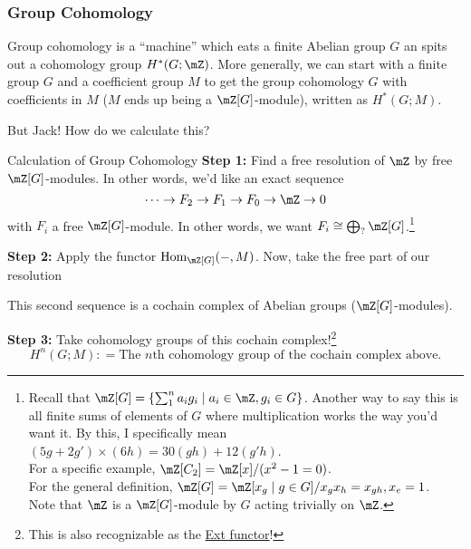 \newpage
\subsubsection{Group Cohomology}

Group cohomology is a ``machine'' which eats a finite Abelian group $G$ an spits out a cohomology group $H^\ast(G;\mZ)$. More generally, we can start with a finite group $G$ and a coefficient group $M$ to get the group cohomology $G$ with coefficients in $M$ ($M$ ends up being a $\mZ[G]$-module), written as $H^\ast(G;M)$. 

But Jack! How do we calculate this?

\begin{definition}{Calculation of Group Cohomology}{}
    \textbf{Step 1:} Find a free resolution of $\mZ$ by free $\mZ[G]$-modules. In other words, we'd like an exact sequence
    $$\cdots\to F_2\to F_1\to F_0\to \mZ\to 0$$
    with $F_i$ a free $\mZ[G]$-module. In other words, we want $F_i\cong \bigoplus_{?}\mZ[G]$.\footnote{Recall that $\mZ[G] = \sets{\sum_1^n a_i g_i\mid a_i\in \mZ, g_i\in G}$. Another way to say this is all finite sums of elements of $G$ where multiplication works the way you'd want it. By this, I specifically mean $(5g+2g')\times (6h) = 30(gh)+12(g'h)$. \\For a specific example, $\mZ[C_2] = \mZ[x]/(x^2-1 = 0)$. \\For the general definition, $\mZ[G] = \mZ[x_g\mid g\in G]/ x_gx_h = x_{gh}, x_e = 1$. \\Note that $\mZ$ is a $\mZ[G]$-module by $G$ acting trivially on $\mZ$.} 

    \medskip
    \textbf{Step 2:} Apply the functor $\Hom_{\mZ[G]}(-,M)$. Now, take the free part of our resolution 
    \begin{center}
    \end{center}
    This second sequence is a cochain complex of Abelian groups ($\mZ[G]$-modules).
    
    \medskip
    \textbf{Step 3:} Take cohomology groups of this cochain complex!\footnote{This is also recognizable as the \href{https://en.wikipedia.org/wiki/Ext_functor}{Ext functor}!} $$H^n(G;M): = \text{The $n$th cohomology group of the cochain complex above.}$$
\end{definition}
